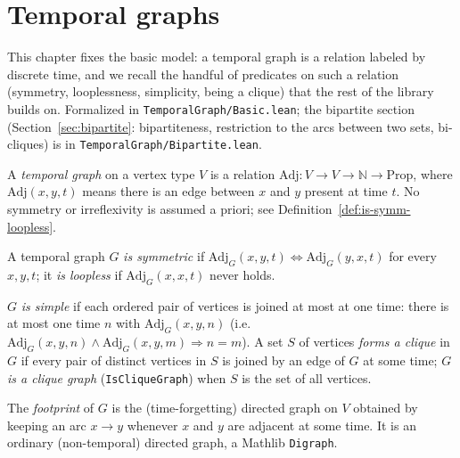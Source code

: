 \chapter{Temporal graphs}
\label{chap:model}

This chapter fixes the basic model: a temporal graph is a relation labeled by
discrete time, and we recall the handful of predicates on such a relation
(symmetry, looplessness, simplicity, being a clique) that the rest of the
library builds on. Formalized in \texttt{TemporalGraph/Basic.lean}; the
bipartite section (Section~\ref{sec:bipartite}: bipartiteness, restriction to the arcs
between two sets, bi-cliques) is in \texttt{TemporalGraph/Bipartite.lean}.

\begin{definition}
  \label{def:temporal-graph}
  \leanok
  A \emph{temporal graph} on a vertex type $V$ is a relation
  $\mathrm{Adj} : V \to V \to \mathbb{N} \to \mathrm{Prop}$, where
  $\mathrm{Adj}(x,y,t)$ means there is an edge between $x$ and $y$ present at
  time $t$. No symmetry or irreflexivity is assumed a priori; see
  Definition~\ref{def:is-symm-loopless}.
\end{definition}

\begin{definition}
  \label{def:is-symm-loopless}
  \leanok
  A temporal graph $G$ \emph{is symmetric} if $\mathrm{Adj}_G(x,y,t) \iff
  \mathrm{Adj}_G(y,x,t)$ for every $x,y,t$; it \emph{is loopless} if
  $\mathrm{Adj}_G(x,x,t)$ never holds.
\end{definition}

\begin{definition}
  \label{def:is-simple-clique}
  \leanok
  $G$ \emph{is simple} if each ordered pair of vertices is joined at most
  at one time: there is at most one time $n$ with $\mathrm{Adj}_G(x,y,n)$
  (i.e.\ $\mathrm{Adj}_G(x,y,n) \wedge \mathrm{Adj}_G(x,y,m)
  \Rightarrow n = m$). A set $S$ of vertices \emph{forms a clique} in $G$ if
  every pair of distinct vertices in $S$ is joined by an edge of $G$ at some
  time; $G$ \emph{is a clique graph} (\texttt{IsCliqueGraph}) when $S$ is the set of all vertices.
\end{definition}

\begin{definition}[Footprint]
  \label{def:footprint}
  \leanok
  The \emph{footprint} of $G$ is the (time-forgetting) directed graph on $V$
  obtained by keeping an arc $x \to y$ whenever $x$ and $y$ are adjacent at
  some time. It is an ordinary (non-temporal) directed graph, a Mathlib
  \texttt{Digraph}.
\end{definition}

